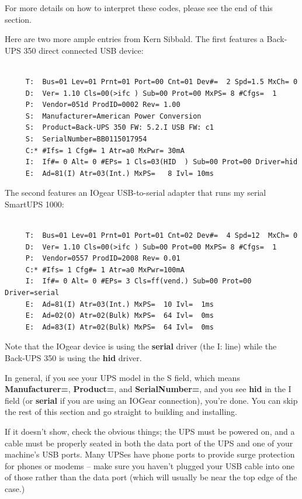 For more details on how to interpret these codes, please see the end of this
section.  

Here are two more ample entries from Kern Sibbald.  The first features a
Back-UPS 350 direct connected USB device: 

\footnotesize
\begin{verbatim}
     
     T:  Bus=01 Lev=01 Prnt=01 Port=00 Cnt=01 Dev#=  2 Spd=1.5 MxCh= 0
     D:  Ver= 1.10 Cls=00(>ifc ) Sub=00 Prot=00 MxPS= 8 #Cfgs=  1
     P:  Vendor=051d ProdID=0002 Rev= 1.00
     S:  Manufacturer=American Power Conversion
     S:  Product=Back-UPS 350 FW: 5.2.I USB FW: c1
     S:  SerialNumber=BB0115017954
     C:* #Ifs= 1 Cfg#= 1 Atr=a0 MxPwr= 30mA
     I:  If#= 0 Alt= 0 #EPs= 1 Cls=03(HID  ) Sub=00 Prot=00 Driver=hid
     E:  Ad=81(I) Atr=03(Int.) MxPS=   8 Ivl= 10ms
\end{verbatim}
\normalsize

The second features an IOgear USB-to-serial adapter that runs my serial
SmartUPS 1000: 

\footnotesize
\begin{verbatim}
     
     T:  Bus=01 Lev=01 Prnt=01 Port=01 Cnt=02 Dev#=  4 Spd=12  MxCh= 0
     D:  Ver= 1.10 Cls=00(>ifc ) Sub=00 Prot=00 MxPS= 8 #Cfgs=  1
     P:  Vendor=0557 ProdID=2008 Rev= 0.01
     C:* #Ifs= 1 Cfg#= 1 Atr=a0 MxPwr=100mA
     I:  If#= 0 Alt= 0 #EPs= 3 Cls=ff(vend.) Sub=00 Prot=00 Driver=serial
     E:  Ad=81(I) Atr=03(Int.) MxPS=  10 Ivl=  1ms
     E:  Ad=02(O) Atr=02(Bulk) MxPS=  64 Ivl=  0ms
     E:  Ad=83(I) Atr=02(Bulk) MxPS=  64 Ivl=  0ms
\end{verbatim}
\normalsize

Note that the IOgear device is using the {\bf serial} driver (the I: line)
while the Back-UPS 350 is using the {\bf hid} driver.  

In general, if you see your UPS model in the S field, which means {\bf
Manufacturer=}, {\bf Product=}, and {\bf SerialNumber=}, and you see {\bf hid}
in the I field (or {\bf serial} if you are using an IOGear connection), you're
done.  You can skip the rest of this section and go straight to building and
installing.  

If it doesn't show, check the obvious things; the UPS must be powered on, and
a cable must be properly seated in both the data port of the UPS and one of
your machine's USB ports.  Many UPSes have phone ports to provide surge
protection for phones or modems {--} make sure you haven't plugged your USB
cable into one of those rather than the data port (which will usually be near
the top edge of the case.)  

